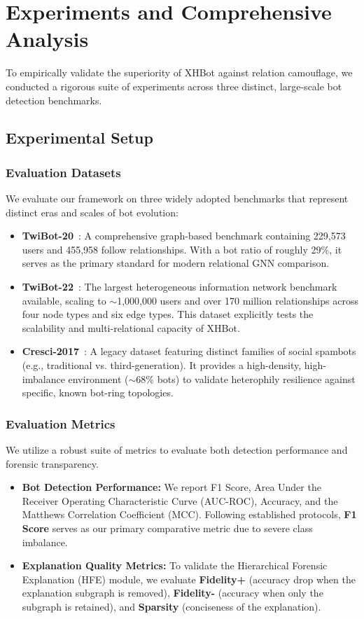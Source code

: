 \section{Experiments and Comprehensive Analysis}

To empirically validate the superiority of XHBot against relation camouflage, we conducted a rigorous suite of experiments across three distinct, large-scale bot detection benchmarks.

\subsection{Experimental Setup}

\subsubsection{Evaluation Datasets}
We evaluate our framework on three widely adopted benchmarks that represent distinct eras and scales of bot evolution:
\begin{itemize}
    \item \textbf{TwiBot-20}~\cite{feng2021twibot20}: A comprehensive graph-based benchmark containing 229,573 users and 455,958 follow relationships. With a bot ratio of roughly 29\%, it serves as the primary standard for modern relational GNN comparison.
    \item \textbf{TwiBot-22}~\cite{feng2022twibot22}: The largest heterogeneous information network benchmark available, scaling to $\sim$1,000,000 users and over 170 million relationships across four node types and six edge types. This dataset explicitly tests the scalability and multi-relational capacity of XHBot.
    \item \textbf{Cresci-2017}~\cite{cresci2017paradigm}: A legacy dataset featuring distinct families of social spambots (e.g., traditional vs. third-generation). It provides a high-density, high-imbalance environment ($\sim$68\% bots) to validate heterophily resilience against specific, known bot-ring topologies.
\end{itemize}

\subsubsection{Evaluation Metrics}
We utilize a robust suite of metrics to evaluate both detection performance and forensic transparency.
\begin{itemize}
    \item \textbf{Bot Detection Performance:} We report F1 Score, Area Under the Receiver Operating Characteristic Curve (AUC-ROC), Accuracy, and the Matthews Correlation Coefficient (MCC). Following established protocols, \textbf{F1 Score} serves as our primary comparative metric due to severe class imbalance.
    \item \textbf{Explanation Quality Metrics:} To validate the Hierarchical Forensic Explanation (HFE) module, we evaluate \textbf{Fidelity+} (accuracy drop when the explanation subgraph is removed), \textbf{Fidelity-} (accuracy when only the subgraph is retained), and \textbf{Sparsity} (conciseness of the explanation).
\end{itemize}


